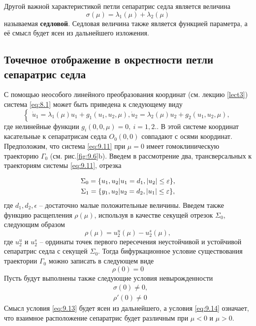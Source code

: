 Другой важной характеристикой петли сепаратрис седла является величина
\begin{equation}
        \label{eq:9.10}
        \sigma(\mu) = \lambda_1(\mu) + \lambda_2(\mu)
\end{equation}
называемая \textbf{седловой}. Седловая величина также является функцией параметра,
а её смысл будет ясен из дальнейшего изложения.

\subsection{Точечное отображение в окрестности петли сепаратрис седла}%
\label{sec:9.2.1}
С помощью неособого линейного преобразования координат (см. лекцию \ref{lect3})
система \eqref{eq:8.1} может быть приведена к следующему виду
\begin{equation}
        \label{eq:9.11}
        \begin{cases}
                \dot u_1 = \lambda_1(\mu) u_1 + g_1(u_1,u_2,\mu),
                \dot u_2 = \lambda_2(\mu) u_2 + g_2(u_1,u_2,\mu),
        \end{cases}
\end{equation}
где нелинейные функции $g_i(0,0,\mu)=0,~ i =1,2.$. В этой системе координат 
касательные к сепаратрисам седла $O_0(0,0)$ совпадают с осями координат.
Предположим, что система \eqref{eq:9.11} при $\mu=0$ имеет гомоклиническую траекторию
$\Gamma_0$ (см. рис.\ref{fig:9.6}b). Введем в рассмотрение два, трансверсальных к траекториям системы \eqref{eq:9.11}, отрезка

\begin{gather}
        \Sigma_0 = \qty{u_1,u_2 | u_1 = d_1, |u_2| \leq \varepsilon}, \\
        \Sigma_1 = \qty{y_1,u_2 | u_2 = d_2, |u_1| \leq \varepsilon},
\end{gather}
где $d_1, d_2,\epsilon$ -- достаточно малые положительные величины. 
Введем также функцию расщепления $\rho(\mu)$, используя в качестве секущей отрезок $\Sigma_0$, 
следующим образом
\begin{equation}
        \label{eq:}
        \rho(\mu) = u_2^u(\mu) - u_2^s(\mu),
\end{equation}
где $u_2^u$ и $u_2^s$ -- ординаты точек первого пересечения неустойчивой и устойчивой сепаратрис седла
с секущей $\Sigma_0.$ Тогда бифуркационное условие существования траектории $\Gamma_0$ можно записать
в следующем виде
\begin{equation}
        \label{eq:9.12}
        \rho(0) =0
\end{equation}
Пусть будут выполнены также следующие условия невырожденности
\begin{align}
        \label{eq:9.13}
        & \sigma(0) \neq 0, \\
        \label{eq:9.14}
        & \rho'(0) \neq 0
\end{align}
Смысл условия \eqref{eq:9.13} будет ясен из дальнейшего, а условия \eqref{eq:9.14} означает, что
взаимное расположение сепаратрис будет различным при $\mu<0$ и $\mu>0$.

